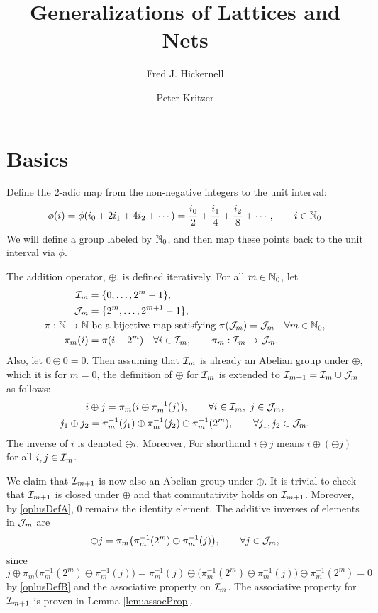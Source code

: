 \documentclass[12pt]{amsart}
\title{Generalizations of Lattices and Nets}
\author{Fred J. Hickernell}
\author{Peter Kritzer}
\begin{document}
\maketitle

\section{Basics}

Define the $2$-adic map from the non-negative integers to the unit interval:
\begin{equation}
\phi(i) = \phi(i_0 + 2 i_1 + 4 i_2 + \cdots) = \frac{i_0}{2} + \frac{i_1}{4} + \frac{i_2} {8} + \cdots, \qquad i \in \mathbb{N}_{0}
\end{equation}
We will define a group labeled by $\mathbb{N}_{0}$, and then map these points back to the unit interval via $\phi$.

The addition operator, $\oplus$, is defined iteratively. For all $m \in \mathbb{N}_{0}$, let 
\begin{align*}
    \mathcal{I}_m & = \{0, \ldots, 2^m -1\}, \\
    \mathcal{J}_m & = \{2^m, \dots, 2^{m+1}-1 \}, \\
    \pi:\mathbb{N} \to \mathbb{N} & \text{ be a bijective map satisfying } \pi(\mathcal{J}_m) = \mathcal{J}_m \quad \forall m \in \mathbb{N}_{0}, \\
    \pi_m(i) & = \pi(i+2^m) \quad \forall i \in \mathcal{I}_m, \qquad \pi_m:\mathcal{I}_m \to \mathcal{J}_m.
\end{align*}
Also, let $0 \oplus 0 = 0$.  Then assuming that $\mathcal{I}_m$ is already an Abelian group under $\oplus$, which it is for $m=0$, the definition of $\oplus$ for $\mathcal{I}_m$ is extended to $\mathcal{I}_{m+1} = \mathcal{I}_m \cup \mathcal{J}_m$ as follows:
\begin{subequations} \label{oplusDef}
\begin{gather}
    \label{oplusDefA}
    i \oplus j = \pi_m( i \oplus \pi_m^{-1}(j)), \qquad \forall i \in \mathcal{I}_m,\ j \in \mathcal{J}_m, \\
    \label{oplusDefB}
    j_1 \oplus j_2 = \pi_m^{-1}( j_1) \oplus \pi_m^{-1}(j_2) \ominus \pi_m^{-1}(2^m), \qquad \forall j_1, j_2 \in \mathcal{J}_m.
\end{gather}
\end{subequations}
The inverse of $i$ is denoted $\ominus i$.  Moreover, For shorthand $i \ominus j$ means $i \oplus (\ominus j)$ for all $i, j \in \mathcal{I}_m$.

We claim that $\mathcal{I}_{m+1}$ is now also an Abelian group under $\oplus$.  It is trivial to check that $\mathcal{I}_{m+1}$ is closed under $\oplus$ and that commutativity holds on $\mathcal{I}_{m+1}$.  Moreover, by \eqref{oplusDefA}, $0$ remains the identity element.  The additive inverses of elements in $\mathcal{J}_m$ are 
\begin{equation}
    \ominus j = \pi_m\bigl (\pi_m^{-1}(2^m) \ominus \pi_m^{-1}(j) \bigr ) , \qquad \forall j \in \mathcal{J}_m,
\end{equation}
since 
\[
j \oplus \pi_m\bigl (\pi_m^{-1}(2^m) \ominus \pi_m^{-1}(j)  \bigr ) = \pi_m^{-1}( j) \oplus \bigl ( \pi_m^{-1}(2^m) \ominus \pi_m^{-1}(j) \bigr ) \ominus \pi_m^{-1}(2^m) = 0
\]
by  \eqref{oplusDefB} and the associative property on $\mathcal{I}_m$.  The associative property for $\mathcal{I}_{m+1}$ is proven in Lemma \ref{lem:assocProp}.
\end{document}
